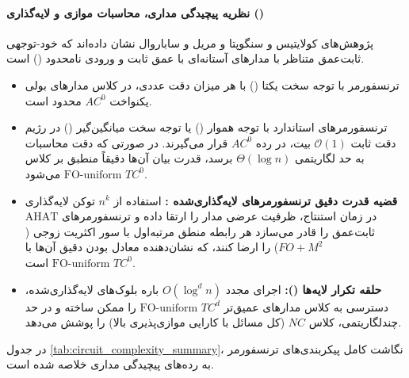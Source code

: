 \paragraph*{نظریه پیچیدگی مداری، محاسبات موازی و لایه‌گذاری ()}
پژوهش‌های کولایتیس و سنگوپتا \cite{kolaitis2026expressive} و مریل و ساباروال \cite{merrill2025exact} نشان داده‌اند که خود-توجهی ثابت‌عمق متناظر با مدارهای آستانه‌ای با عمق ثابت و ورودی نامحدود () است.
\begin{itemize}
    \item ترنسفورمر با توجه سخت یکتا () با هر میزان دقت عددی، در کلاس مدارهای بولی یکنواخت $AC^0$ محدود است.
    \item ترنسفورمرهای استاندارد با توجه هموار () یا توجه سخت میانگین‌گیر () در رژیم دقت ثابت $\mathcal{O}(1)$ بیت، در رده $AC^0$ قرار می‌گیرند. در صورتی که دقت محاسبات به حد لگاریتمی $\Theta(\log n)$ برسد، قدرت بیان آن‌ها دقیقاً منطبق بر کلاس $\text{FO-uniform } TC^0$ می‌شود.
    \item \textbf{قضیه قدرت دقیق ترنسفورمرهای لایه‌گذاری‌شده \cite{merrill2025exact}:} استفاده از $n^k$ توکن لایه‌گذاری در زمان استنتاج، ظرفیت عرضی مدار را ارتقا داده و ترنسفورمرهای $\text{AHAT}$ ثابت‌عمق را قادر می‌سازد هر رابطه منطق مرتبه‌اول با سور اکثریت زوجی ($FO+M^2$) را ارضا کنند، که نشان‌دهنده معادل بودن دقیق آن‌ها با $\text{FO-uniform } TC^0$ است.
    \item \textbf{حلقه تکرار لایه‌ها ():} اجرای مجدد $O(\log^d n)$ باره بلوک‌های لایه‌گذاری‌شده، دسترسی به کلاس مدارهای عمیق‌تر $\text{FO-uniform } TC^d$ را ممکن ساخته و در حد چندلگاریتمی، کلاس $NC$ (کل مسائل با کارایی موازی‌پذیری بالا) را پوشش می‌دهد.
\end{itemize}

در جدول \ref{tab:circuit_complexity_summary}، نگاشت کامل پیکربندی‌های ترنسفورمر به رده‌های پیچیدگی مداری خلاصه شده است.

